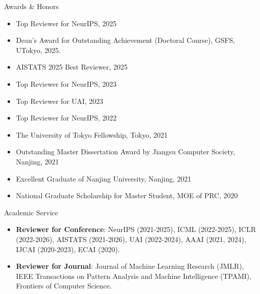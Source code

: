 \documentclass{resume} %
\begin{document}


\begin{rSection}{Awards \& Honors}
\begin{itemize}[leftmargin=*]
\item Top Reviewer for NeurIPS, 2025
\item Dean's Award for Outstanding Achievement (Doctoral Course), GSFS, UTokyo, 2025.	
\item AISTATS 2025 Best Reviewer, 2025
\item Top Reviewer for NeurIPS, 2023
\item Top Reviewer for UAI, 2023
\item Top Reviewer for NeurIPS, 2022
\item The University of Tokyo Fellowship, Tokyo, 2021
\item Outstanding Master Dissertation Award by Jiangsu Computer Society, Nanjing, 2021
\item Excellent Graduate of Nanjing University, Nanjing, 2021
\item National Graduate Scholarship for Master Student, MOE of PRC, 2020
\end{itemize}
\end{rSection}

\begin{rSection}{Academic Service}
\begin{itemize}[leftmargin=*]
\item \textbf{Reviewer for Conference}: NeurIPS (2021-2025), ICML (2022-2025), ICLR (2022-2026), AISTATS (2021-2026), UAI (2022-2024), AAAI (2021, 2024), IJCAI (2020-2023), ECAI (2020).
\item \textbf{Reviewer for Journal}: Journal of Machine Learning Research (JMLR), IEEE Transactions on Pattern Analysis and Machine Intelligence (TPAMI), Frontiers of Computer Science.
\end{itemize}

\end{rSection}
\end{document}
